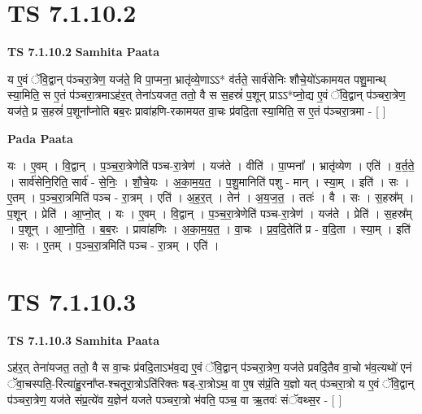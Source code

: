 \documentclass[17pt]{extarticle}
\begin{document}

\section{ TS 7.1.10.2 }

\textbf{TS 7.1.10.2 } \newline
\textbf{Samhita Paata} \newline

य ए॒वं ॅवि॒द्वान् प॑ञ्चरा॒त्रेण॒ यज॑ते॒ वि पा॒प्मना॒ भ्रातृ॑व्ये॒णाऽऽ* व॑र्तते॒ सार्व॑सेनिः शौचे॒यो॑ऽकामयत पशु॒मान्थ् स्या॒मिति॒ स ए॒तं प॑ञ्चरा॒त्रमाऽह॑र॒त् तेना॑ऽयजत॒ ततो॒ वै स स॒हस्रं॑ प॒शून् प्राऽऽ*प्नो॒द्य ए॒वं ॅवि॒द्वान् प॑ञ्चरा॒त्रेण॒ यज॑ते॒ प्र स॒हस्रं॑ प॒शूना᳚प्नोति बब॒रः प्रावा॑हणि-रकामयत वा॒चः प्र॑वदि॒ता स्या॒मिति॒ स ए॒तं प॑ञ्चरा॒त्रमा - [  ] \newline

\textbf{Pada Paata} \newline

यः । ए॒वम् । वि॒द्वान् । प॒ञ्च॒रा॒त्रेणेति॑ पञ्च-रा॒त्रेण॑ । यज॑ते । वीति॑ । पा॒प्मना᳚ । भ्रातृ॑व्येण । एति॑ । व॒र्त॒ते॒ । सार्व॑सेनि॒रिति॒ सार्व॑ - से॒निः॒ । शौ॒चे॒यः । अ॒का॒म॒य॒त॒ । प॒शु॒मानिति॑ पशु - मान् । स्या॒म् । इति॑ । सः । ए॒तम् । प॒ञ्च॒रा॒त्रमिति॑ पञ्च - रा॒त्रम् । एति॑ । अ॒ह॒र॒त् । तेन॑ । अ॒य॒ज॒त॒ । ततः॑ । वै । सः । स॒हस्र᳚म् । प॒शून् । प्रेति॑ । आ॒प्नो॒त् । यः । ए॒वम् । वि॒द्वान् । प॒ञ्च॒रा॒त्रेणेति॑ पञ्च-रा॒त्रेण॑ । यज॑ते । प्रेति॑ । स॒हस्र᳚म् । प॒शून् । आ॒प्नो॒ति॒ । ब॒ब॒रः । प्रावा॑हणिः । अ॒का॒म॒य॒त॒ । वा॒चः । प्र॒व॒दि॒तेति॑ प्र - व॒दि॒ता । स्या॒म् । इति॑ । सः । ए॒तम् । प॒ञ्च॒रा॒त्रमिति॑ पञ्च - रा॒त्रम् । एति॑ ।  \newline





\section{ TS 7.1.10.3 }

\textbf{TS 7.1.10.3 } \newline
\textbf{Samhita Paata} \newline

ऽह॑र॒त् तेना॑यजत॒ ततो॒ वै स वा॒चः प्र॑वदि॒ताऽभ॑व॒द्य ए॒वं ॅवि॒द्वान् प॑ञ्चरा॒त्रेण॒ यज॑ते प्रवदि॒तैव वा॒चो भ॑व॒त्यथो॑ एनं ॅवा॒चस्पति॒-रित्या॑हु॒रना᳚प्त-श्चतूरा॒त्रोऽति॑रिक्तः षड्-रा॒त्रोऽथ॒ वा ए॒ष स॑प्रं॒ति य॒ज्ञो यत् प॑ञ्चरा॒त्रो य ए॒वं ॅवि॒द्वान् प॑ञ्चरा॒त्रेण॒ यज॑ते संप्र॒त्ये॑व य॒ज्ञेन॑ यजते पञ्चरा॒त्रो भ॑वति॒ पञ्च॒ वा ऋ॒तवः॑ संॅवथ्स॒र - [  ] \newline
\end{document}
